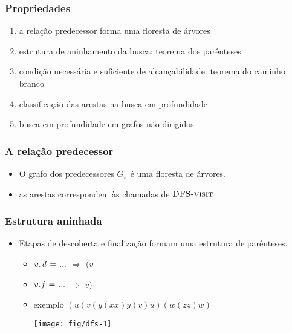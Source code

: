 \documentclass{beamer}
\begin{document}
\begin{frame}
\frametitle{Propriedades}

\begin{enumerate}
\item a relação predecessor forma uma floresta de árvores
\item estrutura de aninhamento da busca: teorema dos parênteses
\item condição necessária e suficiente de alcançabilidade: teorema do caminho branco
\item classificação das arestas na busca em profundidade
\item busca em profundidade em grafos não dirigidos
\end{enumerate}

\end{frame}

\begin{frame}
\frametitle{A relação predecessor}

\begin{itemize}
\item O grafo dos predecessores $G_\pi$ é uma floresta de árvores.

\item as arestas correspondem às chamadas de $\textnormal{\scshape DFS-visit}$

\end{itemize}

\end{frame}

\begin{frame}
\frametitle{Estrutura aninhada}

\begin{itemize}

\item Etapas de descoberta e finalização formam uma estrutura de parênteses.

\begin{itemize}

\item $\attrib{v}{d} \gets ...$ $\Longrightarrow$ $(v$

\item $\attrib{v}{f} \gets ...$ $\Longrightarrow$ $v)$

\item exemplo $(u (v (y (x x) y) v) u) (w (z z) w)$

\texttt{[image: fig/dfs-1]}

\end{itemize}

\end{itemize}

\end{frame}
\end{document}
